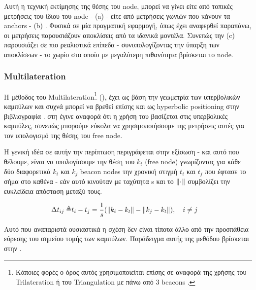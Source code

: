 Αυτή η τεχνική εκτίμησης της θέσης του node, μπορεί να γίνει είτε από τοπικές μετρήσεις του ίδιου του node -
 (a) - είτε από μετρήσεις γωνιών που κάνουν τα anchors -  (b)
\cite{wsn-Localization-systems}. Φυσικά σε μία πραγματική εφαρμογή, όπως έχει αναφερθεί παραπάνω, οι μετρήσεις παρουσιάζουν αποκλίσεις 
από τα ιδανικά μοντέλα. Συνεπώς την  (c) παρουσιάζει σε πιο ρεαλιστικά επίπεδα - συνυπολογίζοντας την ύπαρξη 
των αποκλίσεων - 
το χωρίο στο οποίο με μεγαλύτερη πιθανότητα βρίσκεται το node.

\subsubsection{Multilateration} \label{sec:Multilateration}
Η μέθοδος του Multilateration\footnote{Κάποιες φορές ο όρος αυτός χρησιμοποιείται επίσης σε αναφορά της χρήσης του Trilateration ή του Triangulation με πάνω από 3 beacons \cite{wsn-Localization-systems} \cite{triangulation-simple-equation}.} (), 
έχει ως βάση την γεωμετρία των υπερβολικών καμπύλων και συχνά μπορεί να βρεθεί επίσης και ως hyperbolic positioning 
στην βιβλιογραφία \cite{multilateration-def} \cite{triangulation-trilateration-multilateration} \cite{wikipedia-multilateration}. στη  
έγινε αναφορά ότι η χρήση του  βασίζεται στις υπερβολικές καμπύλες, συνεπώς μπορούμε εύκολα να χρησιμοποιήσουμε
της μετρήσεις αυτές για τον υπολογισμό της θέσης του free node.

Η γενική ιδέα σε αυτήν την περίπτωση περιγράφεται στην εξίσωση  \cite{wsn-Localization-techniques} \cite{simple-tdoa} - και αυτό που 
θέλουμε, είναι να υπολογίσουμε την θέση του $k_t$ (free node) γνωρίζοντας για κάθε δύο διαφορετικά $k_i$ και $k_j$ beacon nodes
την χρονική στιγμή $t_i$ και $t_j$ που έφτασε το σήμα στο καθένα - εάν αυτό κινούταν με ταχύτητα s και το $\left\lVert\cdot\right\rVert$ συμβολίζει την ευκλείδεια
απόσταση μεταξύ τους.

\begin{align}
	\Delta t_{ij} \triangleq & t_i - t_j = \frac{1}{s} (\left\lVert k_i - k_t\right\rVert - \left\lVert k_j - k_t\right\rVert), \quad i \neq j\label{eq:tdoa-multiple}
\end{align}

Αυτό που αναπαριστά ουσιαστικά η σχέση  δεν είναι τίποτα άλλο από την προσπάθεια εύρεσης του σημείου τομής των καμπύλων.
Παράδειγμα αυτής της μεθόδου βρίσκεται στην .

